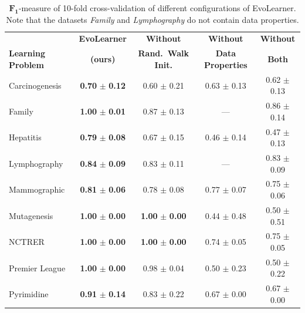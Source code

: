 \begin{table}[tb]
  \centering
  \caption{$\boldsymbol{F_1}$-measure of 10-fold cross-validation of different configurations of EvoLearner. Note that the datasets \textit{Family} and \textit{Lymphography} do not contain data properties.}%
  \label{tab:ablation-analysis}
  \setlength{\tabcolsep}{2pt}
  \renewcommand{\arraystretch}{1.08}
  \footnotesize
  \begin{tabular}{@{}lcccc@{}}
    \toprule
     & \textbf{EvoLearner} & \textbf{Without} & \textbf{Without} & \textbf{Without} \\
    \textbf{Learning Problem} & \textbf{(ours)} & \textbf{Rand.\ Walk Init.} & \textbf{Data Properties} & \textbf{Both} \\
    \midrule
    Carcinogenesis &  \textbf{0.70} $\boldsymbol{\pm}$ \textbf{0.12} & 0.60 $\pm$ 0.21 & 0.63 $\pm$ 0.13 & 0.62 $\pm$ 0.13 \\
    
    Family & \textbf{1.00} $\boldsymbol{\pm}$ \textbf{0.01} & 0.87 $\pm$ 0.13 & --- & 0.86 $\pm$ 0.14\\
    
    Hepatitis & \textbf{0.79} $\boldsymbol{\pm}$ \textbf{0.08} & 0.67 $\pm$ 0.15 & 0.46 $\pm$ 0.14 & 0.47 $\pm$ 0.13\\
    
    Lymphography & \textbf{0.84} $\boldsymbol{\pm}$ \textbf{0.09} & 0.83 $\pm$ 0.11 & --- & 0.83 $\pm$ 0.09\\
    
    Mammographic & \textbf{0.81} $\boldsymbol{\pm}$ \textbf{0.06} & 0.78 $\pm$ 0.08 & 0.77 $\pm$ 0.07 & 0.75 $\pm$ 0.06\\
    
    Mutagenesis & \textbf{1.00} $\boldsymbol{\pm}$ \textbf{0.00} & \textbf{1.00} $\boldsymbol{\pm}$ \textbf{0.00} & 0.44 $\pm$ 0.48 & 0.50 $\pm$ 0.51\\
    
    NCTRER & \textbf{1.00} $\boldsymbol{\pm}$ \textbf{0.00} & \textbf{1.00} $\boldsymbol{\pm}$ \textbf{0.00} & 0.74 $\pm$ 0.05 & 0.75 $\pm$ 0.05\\
    
    Premier League & \textbf{1.00} $\boldsymbol{\pm}$ \textbf{0.00} & 0.98 $\pm$ 0.04 & 0.50 $\pm$ 0.23 & 0.50 $\pm$ 0.22\\
    
    Pyrimidine & \textbf{0.91} $\boldsymbol{\pm}$ \textbf{0.14} & 0.83 $\pm$ 0.22 & 0.67 $\pm$ 0.00 & 0.67 $\pm$ 0.00\\
    \bottomrule
  \end{tabular}
\end{table}
